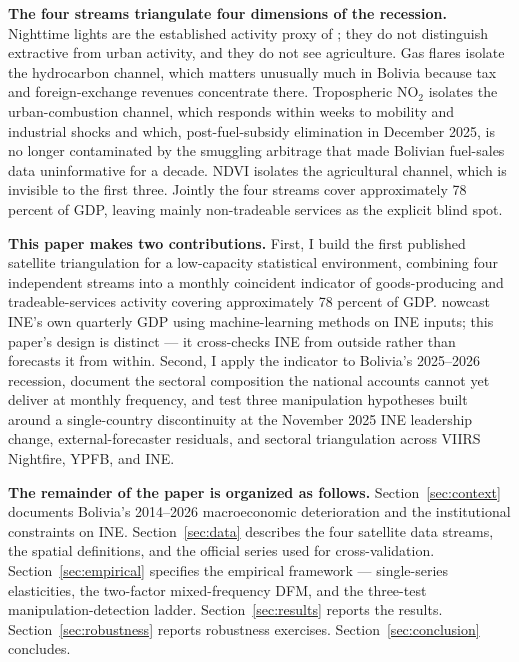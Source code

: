\documentclass[11pt,letterpaper]{article}
\newcommand{\claim}[1]{\textbf{#1.}}
\begin{document}
\claim{The four streams triangulate four dimensions of the recession} Nighttime lights are the established activity proxy of \citet{hsw2012}; they do not distinguish extractive from urban activity, and they do not see agriculture. Gas flares isolate the hydrocarbon channel, which matters unusually much in Bolivia because tax and foreign-exchange revenues concentrate there. Tropospheric NO$_2$ isolates the urban-combustion channel, which responds within weeks to mobility and industrial shocks and which, post-fuel-subsidy elimination in December \num{2025}, is no longer contaminated by the smuggling arbitrage that made Bolivian fuel-sales data uninformative for a decade. NDVI isolates the agricultural channel, which is invisible to the first three. Jointly the four streams cover approximately \num{78} percent of GDP, leaving mainly non-tradeable services as the explicit blind spot.

\claim{This paper makes two contributions} First, I build the first published satellite triangulation for a low-capacity statistical environment, combining four independent streams into a monthly coincident indicator of goods-producing and tradeable-services activity covering approximately \num{78} percent of GDP. \citet{bolivar_cuba2024} nowcast INE's own quarterly GDP using machine-learning methods on INE inputs; this paper's design is distinct --- it cross-checks INE from outside rather than forecasts it from within. Second, I apply the indicator to Bolivia's \numrange{2025}{2026} recession, document the sectoral composition the national accounts cannot yet deliver at monthly frequency, and test three manipulation hypotheses built around a single-country discontinuity at the November 2025 INE leadership change, external-forecaster residuals, and sectoral triangulation across VIIRS Nightfire, YPFB, and INE.

\claim{The remainder of the paper is organized as follows} Section~\ref{sec:context} documents Bolivia's \numrange{2014}{2026} macroeconomic deterioration and the institutional constraints on INE. Section~\ref{sec:data} describes the four satellite data streams, the spatial definitions, and the official series used for cross-validation. Section~\ref{sec:empirical} specifies the empirical framework --- single-series elasticities, the two-factor mixed-frequency DFM, and the three-test manipulation-detection ladder. Section~\ref{sec:results} reports the results. Section~\ref{sec:robustness} reports robustness exercises. Section~\ref{sec:conclusion} concludes.
\end{document}
